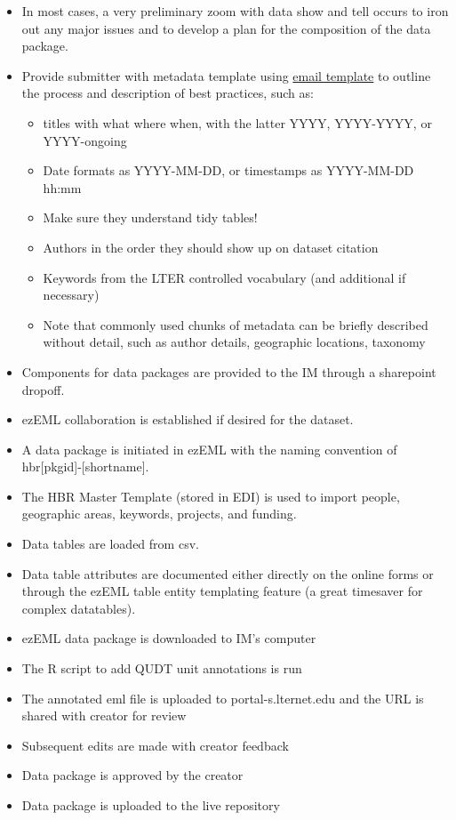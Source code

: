 \documentclass[
  letterpaper,
  DIV=11,
  numbers=noendperiod]{scrreprt}
\providecommand{\tightlist}{%
  \setlength{\itemsep}{0pt}\setlength{\parskip}{0pt}}\usepackage{longtable,booktabs,array}
\begin{document}
\begin{itemize}
\tightlist
\item
  In most cases, a very preliminary zoom with data show and tell occurs
  to iron out any major issues and to develop a plan for the composition
  of the data package.
\item
  Provide submitter with metadata template using \href{DBD}{email
  template} to outline the process and description of best practices,
  such as:

  \begin{itemize}
  \tightlist
  \item
    titles with what where when, with the latter YYYY, YYYY-YYYY, or
    YYYY-ongoing
  \item
    Date formats as YYYY-MM-DD, or timestamps as YYYY-MM-DD hh:mm
  \item
    Make sure they understand tidy tables!
  \item
    Authors in the order they should show up on dataset citation
  \item
    Keywords from the LTER controlled vocabulary (and additional if
    necessary)
  \item
    Note that commonly used chunks of metadata can be briefly described
    without detail, such as author details, geographic locations,
    taxonomy
  \end{itemize}
\item
  Components for data packages are provided to the IM through a
  sharepoint dropoff.
\item
  ezEML collaboration is established if desired for the dataset.
\item
  A data package is initiated in ezEML with the naming convention of
  hbr{[}pkgid{]}-{[}shortname{]}.
\item
  The HBR Master Template (stored in EDI) is used to import people,
  geographic areas, keywords, projects, and funding.
\item
  Data tables are loaded from csv.
\item
  Data table attributes are documented either directly on the online
  forms or through the ezEML table entity templating feature (a great
  timesaver for complex datatables).
\item
  ezEML data package is downloaded to IM's computer
\item
  The R script to add QUDT unit annotations is run
\item
  The annotated eml file is uploaded to portal-s.lternet.edu and the URL
  is shared with creator for review
\item
  Subsequent edits are made with creator feedback
\item
  Data package is approved by the creator
\item
  Data package is uploaded to the live repository
\end{itemize}
\end{document}
